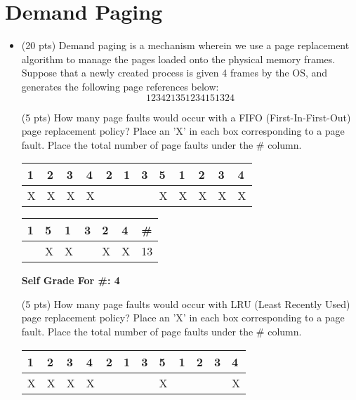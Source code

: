 \documentclass[conference]{IEEEtran}
\begin{document}
\section{Demand Paging}
\begin{itemize}
	\item (20 pts) Demand paging is a mechanism wherein we use a page replacement algorithm to manage the
	pages loaded onto the physical memory frames. Suppose that a newly created process is given 4
	frames by the OS, and generates the following page references below:
	\begin{equation}
	1 2 3 4 2 1 3 5 1 2 3 4 1 5 1 3 2 4
	\end{equation}
	
(5 pts) How many page faults would occur with a FIFO (First-In-First-Out) page
replacement policy? Place an 'X' in each box corresponding to a page fault. Place the total
number of page faults under the \# column.
\begin{table}[H]
	\centering
	\begin{tabular}{|l|l|l|l|l|l|l|l|l|l|l|l|}
		\hline
		\textbf{1} & \textbf{2} & \textbf{3} & \textbf{4} & \textbf{2} & \textbf{1} & \textbf{3} & \textbf{5} & \textbf{1} & \textbf{2} & \textbf{3} & \textbf{4} \\ \hline
		X & X & X & X &  &  &  & X & X & X & X & X \\ \hline
	\end{tabular}
\end{table}

\begin{table}[H]
	\centering
	\begin{tabular}{|l|l|l|l|l|l|l|}
		\hline
		\textbf{1} & \textbf{5} & \textbf{1} & \textbf{3} & \textbf{2} & \textbf{4} & \textbf{\#} \\ \hline
		 & X & X &  & X & X & 13 \\ \hline
	\end{tabular}
\end{table}

\begin{center}
	\textbf{Self Grade For \#: 4}
\end{center}

(5 pts) How many page faults would occur with LRU (Least Recently Used) page
replacement policy? Place an 'X' in each box corresponding to a page fault. Place the total
number of page faults under the \# column.
\begin{table}[H]
	\centering
	\begin{tabular}{|l|l|l|l|l|l|l|l|l|l|l|l|}
		\hline
		\textbf{1} & \textbf{2} & \textbf{3} & \textbf{4} & \textbf{2} & \textbf{1} & \textbf{3} & \textbf{5} & \textbf{1} & \textbf{2} & \textbf{3} & \textbf{4} \\ \hline
		X & X & X & X &  &  &  & X &  &  &  & X \\ \hline
	\end{tabular}
\end{table}


\end{itemize}
\end{document}
